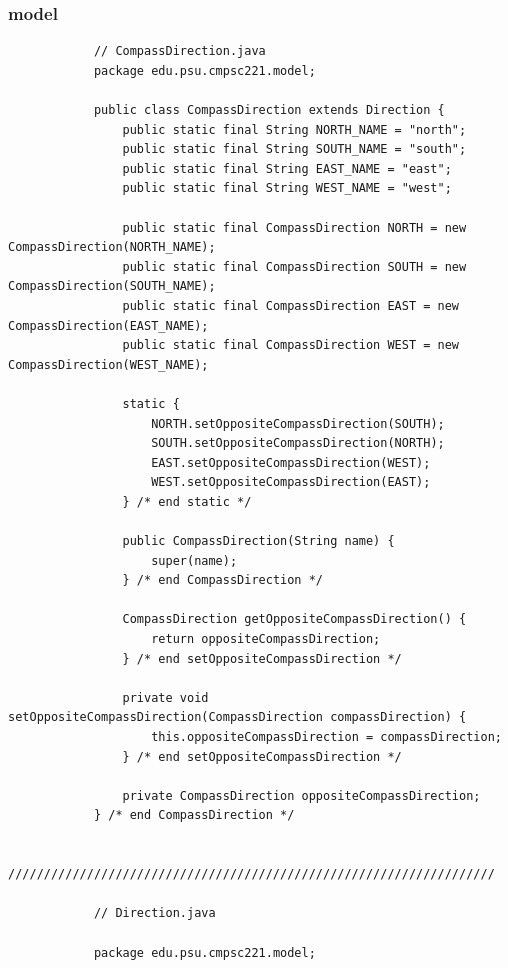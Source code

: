 \documentclass[a4paper, 11pt]{article}
\begin{document}
        \newpage

        \subsubsection{model}
            \begin{lstlisting}
            // CompassDirection.java
            package edu.psu.cmpsc221.model;

            public class CompassDirection extends Direction {
                public static final String NORTH_NAME = "north";
                public static final String SOUTH_NAME = "south";
                public static final String EAST_NAME = "east";
                public static final String WEST_NAME = "west";

                public static final CompassDirection NORTH = new CompassDirection(NORTH_NAME);
                public static final CompassDirection SOUTH = new CompassDirection(SOUTH_NAME);
                public static final CompassDirection EAST = new CompassDirection(EAST_NAME);
                public static final CompassDirection WEST = new CompassDirection(WEST_NAME);

                static {
                    NORTH.setOppositeCompassDirection(SOUTH);
                    SOUTH.setOppositeCompassDirection(NORTH);
                    EAST.setOppositeCompassDirection(WEST);
                    WEST.setOppositeCompassDirection(EAST);
                } /* end static */

                public CompassDirection(String name) {
                    super(name);
                } /* end CompassDirection */

                CompassDirection getOppositeCompassDirection() {
                    return oppositeCompassDirection;
                } /* end setOppositeCompassDirection */

                private void setOppositeCompassDirection(CompassDirection compassDirection) {
                    this.oppositeCompassDirection = compassDirection;
                } /* end setOppositeCompassDirection */

                private CompassDirection oppositeCompassDirection;
            } /* end CompassDirection */

            ////////////////////////////////////////////////////////////////////

            // Direction.java

            package edu.psu.cmpsc221.model;


\end{lstlisting}
\end{document}
